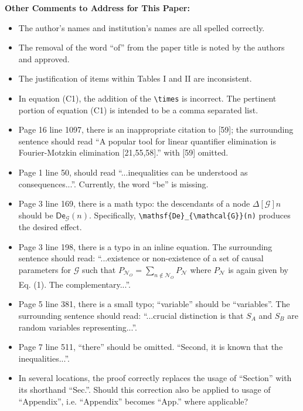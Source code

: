 \documentclass{article}
\begin{document}
    \textbf{Other Comments to Address for This Paper:}
    \begin{itemize}
        \item The author's names and institution's names are all spelled correctly.
        \item The removal of the word ``of'' from the paper title is noted by the authors and approved.
        \item The justification of items within Tables I and II are inconsistent.
        \item In equation (C1), the addition of the \verb|\times| is incorrect. The pertinent portion of equation (C1) is intended to be a comma separated list.
        \item Page 16 line 1097, there is an inappropriate citation to [59]; the surrounding sentence should read ``A popular tool for linear quantifier elimination is Fourier-Motzkin elimination [21,55,58].'' with [59] omitted.
        \item Page 1 line 50, should read ``...inequalities can be understood as consequences...''. Currently, the word ``be'' is missing.
        \item Page 3 line 169, there is a math typo: the descendants of a node $\Delta[\mathcal{G}]n$ should be $\mathsf{De}_{\mathcal{G}}(n)$. Specifically, \verb|\mathsf{De}_{\mathcal{G}}(n)| produces the desired effect.
        \item Page 3 line 198, there is a typo in an inline equation. The surrounding sentence should read: ``...existence or non-existence of a set of causal parameters for $\mathcal G$ such that $P_{\mathcal{N}_{O}} = \sum_{n \not \in \mathcal{N}_{O}} P_{\mathcal{N}}$ where $P_{\mathcal{N}}$ is again given by Eq. (1). The complementary...''.
        \item Page 5 line 381, there is a small typo; ``variable'' should be ``variables''. The surrounding sentence should read: ``...crucial distinction is that $S_{A}$ and $S_{B}$ are random variables representing...''.
        \item Page 7 line 511, ``there'' should be omitted. ``Second, it is known that the inequalities...''.
        \item In several locations, the proof correctly replaces the usage of ``Section'' with its shorthand ``Sec.''. Should this correction also be applied to usage of ``Appendix'', i.e. ``Appendix'' becomes ``App.'' where applicable?
    \end{itemize}
\end{document}
